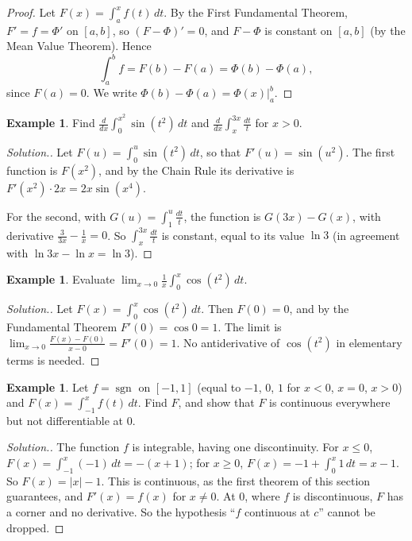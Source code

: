 \documentclass[11pt,a4paper]{article}
\numberwithin{equation}{section}
\theoremstyle{definition}
\newtheorem{exa}[thm]{Example}
\newenvironment{solution}
  {\renewcommand{\qedsymbol}{}\begin{proof}[\textit{Solution}.]}
  {\end{proof}}
\begin{document}
\begin{proof}
Let $F(x) = \int^{x}_a f(t)\, dt$. By the First Fundamental Theorem, $F' = f = \Phi'$ on $[a,b]$, so $(F-\Phi)' = 0$, and $F - \Phi$ is constant on $[a,b]$ (by the Mean Value Theorem). Hence
$$\int_a^bf = F(b) - F(a) = \Phi(b) - \Phi(a),$$
since $F(a) = 0$. We write $\Phi(b) - \Phi(a) = \Phi(x)\big|_a^b$.
\end{proof}

\begin{exa}
Find $\displaystyle\frac{d}{dx}\int_0^{x^2}\sin(t^2)\,dt$ and $\displaystyle\frac{d}{dx}\int_x^{3x}\frac{dt}{t}$ for $x>0$.
\end{exa}

\begin{solution}
Let $F(u) = \int_0^u\sin(t^2)\,dt$, so that $F'(u) = \sin(u^2)$. The first function is $F(x^2)$, and by the Chain Rule its derivative is $F'(x^2)\cdot 2x = 2x\sin(x^4)$.

For the second, with $G(u) = \int_1^u\frac{dt}{t}$, the function is $G(3x) - G(x)$, with derivative $\frac{3}{3x} - \frac{1}{x} = 0$. So $\int_x^{3x}\frac{dt}{t}$ is constant, equal to its value $\ln 3$ (in agreement with $\ln 3x - \ln x = \ln 3$).
\end{solution}

\begin{exa}
Evaluate $\displaystyle\lim_{x\rightarrow 0}\frac{1}{x}\int_0^x\cos(t^2)\,dt$.
\end{exa}

\begin{solution}
Let $F(x) = \int_0^x\cos(t^2)\,dt$. Then $F(0) = 0$, and by the Fundamental Theorem $F'(0) = \cos 0 = 1$. The limit is $\lim_{x\rightarrow0}\frac{F(x) - F(0)}{x - 0} = F'(0) = 1$. No antiderivative of $\cos(t^2)$ in elementary terms is needed.
\end{solution}

\begin{exa}
Let $f = \operatorname{sgn}$ on $[-1,1]$ (equal to $-1$, $0$, $1$ for $x<0$, $x=0$, $x>0$) and $F(x) = \int_{-1}^xf(t)\,dt$. Find $F$, and show that $F$ is continuous everywhere but not differentiable at $0$.
\end{exa}

\begin{solution}
The function $f$ is integrable, having one discontinuity. For $x\leq0$, $F(x) = \int_{-1}^x(-1)\,dt = -(x+1)$; for $x\geq 0$, $F(x) = -1 + \int_0^x 1\,dt = x - 1$. So $F(x) = |x| - 1$. This is continuous, as the first theorem of this section guarantees, and $F'(x) = f(x)$ for $x\neq 0$. At $0$, where $f$ is discontinuous, $F$ has a corner and no derivative. So the hypothesis ``$f$ continuous at $c$'' cannot be dropped.
\end{solution}
\end{document}
